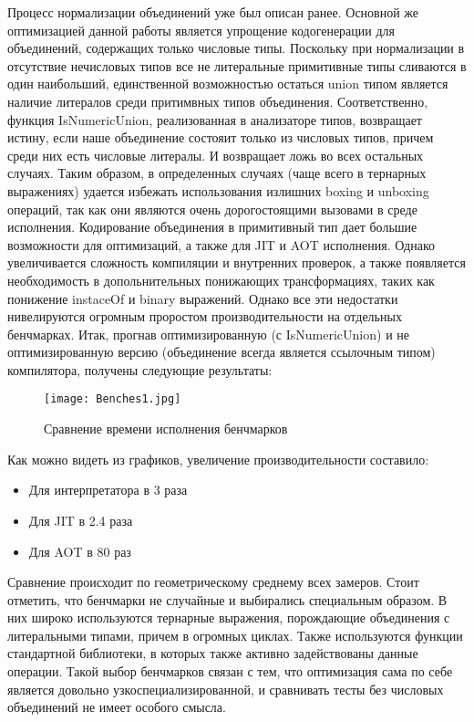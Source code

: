 Процесс нормализации объединений уже был описан ранее.
Основной же оптимизацией данной работы является упрощение кодогенерации для объединений, содержащих только числовые типы.
Поскольку при нормализации в отсутствие нечисловых типов все не литеральные примитивные типы сливаются в один наибольший,
единственной возможностью остаться union типом является наличие литералов среди притимвных типов объединения.
Соответственно, функция IsNumericUnion, реализованная в анализаторе типов, возвращает истину, если наше объединение
состояит только из числовых типов, причем среди них есть числовые литералы.
И возвращает ложь во всех остальных случаях.
Таким образом, в определенных случаях (чаще всего в тернарных выражениях) удается избежать использования излишних
boxing и unboxing операций, так как они являются очень дорогостоящими вызовами в среде исполнения.
Кодирование объединения в примитивный тип дает большие возможности для оптимизаций, а также для JIT и AOT исполнения.
Однако увеличивается сложность компиляции и внутренних проверок, а также появляется необходимость в допольнительных
понижающих трансформациях, таких как понижение instaceOf и binary выражений.
Однако все эти недостатки нивелируются огромным проростом производительности на отдельных бенчмарках.
Итак, прогнав оптимизированную (с IsNumericUnion) и не оптимизированную версию (объединение всегда является
ссылочным типом) компилятора, получены следующие результаты:

\begin{figure}[h]
    \centering
    \texttt{[image: Benches1.jpg]}
    \caption{Сравнение времени исполнения бенчмарков}\label{fig:figure}
\end{figure}

Как можно видеть из графиков, увеличение производительности составило:

\begin{itemize}[left=2em]
    \item Для интерпретатора в 3 раза

    \item Для JIT в 2.4 раза

    \item Для AOT в 80 раз
\end{itemize}

Сравнение происходит по геометрическому среднему всех замеров.
Стоит отметить, что бенчмарки не случайные и выбирались специальным образом.
В них широко используются тернарные выражения, порождающие объединения с литеральными типами, причем в огромных циклах.
Также используются функции стандартной библиотеки, в которых также активно задействованы данные операции.
Такой выбор бенчмарков связан с тем, что оптимизация сама по себе является довольно узкоспециализированной, и сравнивать
тесты без числовых объединений не имеет особого смысла.


\newpage
